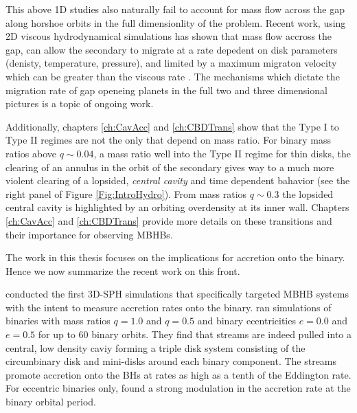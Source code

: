 This above 1D studies also naturally fail to account for mass flow across the
gap along horshoe orbits in the full dimensionlity of the problem. Recent
work, using 2D viscous hydrodynamical simulations has shown that mass flow
accross the gap, can allow the secondary to migrate at a rate depedent on disk
parameters (denisty, temperature, pressure), and limited by a maximum migraton
velocity which can be greater than the viscous rate \citep{Edgar:2008,
DuffellFTV:2014, DurmannKley:2015}. The mechanisms which dictate the migration
rate of gap openeing planets in the full two and three dimensional pictures is
a topic of ongoing work.



Additionally, chapters \ref{ch:CavAcc} \citep{DHM:2013:MNRAS} and \ref{ch:CBDTrans}
\citep{D'Orazio:CBDTrans:2016} show that the Type I to Type II regimes are not
the only that depend on mass ratio. For binary mass ratios above $q\sim0.04$,
a mass ratio well into the Type II regime for thin disks, the clearing of an
annulus in the orbit of the secondary gives way to a much more violent
clearing of a lopsided, \emph{central cavity} and time dependent bahavior (see the right panel of Figure \ref{Fig:IntroHydro}).
From mass ratios $q \sim 0.3$ the lopsided central cavity is highlighted by an
orbiting overdensity at its inner wall. Chapters \ref{ch:CavAcc} and
\ref{ch:CBDTrans} provide more details on these transitions and their
importance for observing MBHBs.




The work in this thesis focuses on the implications for accretion onto the binary. Hence we now summarize the recent work on this front.


\cite{Hayasaki:2007} conducted the first 3D-SPH simulations that specifically
targeted MBHB systems with the intent to measure accretion rates onto the
binary. \cite{Hayasaki:2007} ran simulations of binaries with mass ratios
$q=1.0$ and $q=0.5$ and binary ecentricities $e=0.0$ and $e=0.5$ for up to 60
binary orbits. They find that streams are indeed pulled into a central, low
density caviy forming a triple disk system \citep{Hayasaki+2008} consisting of
the circumbinary disk and mini-disks around each binary component. The streams
promote accretion onto the BHs at rates as high as a tenth of the Eddington
rate. For eccentric binaries only, \cite{Hayasaki:2007} found a strong modulation in
the accretion rate at the binary orbital period. 

